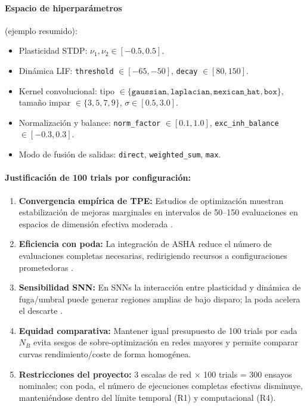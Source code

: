 \paragraph{Espacio de hiperparámetros} (ejemplo resumido):
\begin{itemize}
    \item Plasticidad STDP: $\nu_1, \nu_2 \in [-0.5, 0.5]$.
    \item Dinámica LIF: \texttt{threshold} $\in [-65, -50]$, \texttt{decay} $\in [80, 150]$.
    \item Kernel convolucional: tipo $\in \{\texttt{gaussian}, \texttt{laplacian}, \texttt{mexican\_hat}, \texttt{box}\}$, tamaño impar $\in \{3,5,7,9\}$, $\sigma \in [0.5, 3.0]$.
    \item Normalización y balance: \texttt{norm\_factor} $\in [0.1,1.0]$, \texttt{exc\_inh\_balance} $\in [-0.3,0.3]$.
    \item Modo de fusión de salidas: \texttt{direct}, \texttt{weighted\_sum}, \texttt{max}.
\end{itemize}

\paragraph{Justificación de 100 trials por configuración:}
\begin{enumerate}
    \item \textbf{Convergencia empírica de TPE:} Estudios de optimización muestran estabilización de mejoras marginales en intervalos de 50--150 evaluaciones en espacios de dimensión efectiva moderada \cite{bergstra_random_2012, akiba_optuna_2019}.
    \item \textbf{Eficiencia con poda:} La integración de ASHA reduce el número de evaluaciones completas necesarias, redirigiendo recursos a configuraciones prometedoras \cite{li_system_2020, noauthor_efficient_2021}.
    \item \textbf{Sensibilidad SNN:} En SNNs la interacción entre plasticidad y dinámica de fuga/umbral puede generar regiones amplias de bajo disparo; la poda acelera el descarte \cite{firmin_parallel_2024, parsa_bayesian-based_2019}.
    \item \textbf{Equidad comparativa:} Mantener igual presupuesto de 100 trials por cada $N_B$ evita sesgos de sobre-optimización en redes mayores y permite comparar curvas rendimiento/coste de forma homogénea.
    \item \textbf{Restricciones del proyecto:} 3 escalas de red $\times$ 100 trials = 300 ensayos nominales; con poda, el número de ejecuciones completas efectivas disminuye, manteniéndose dentro del límite temporal (R1) y computacional (R4).
\end{enumerate}

